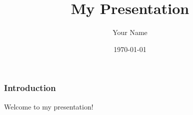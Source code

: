 \documentclass{beamer}
\title{My Presentation}
\author{Your Name}
\date{\today}
\begin{document}
\maketitle

\begin{frame}
    \frametitle{Introduction}
    Welcome to my presentation!
\end{frame}
\end{document}
